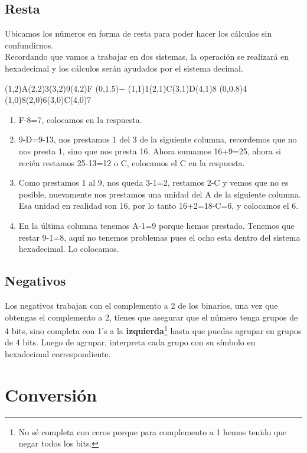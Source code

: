 \documentclass[
	12pt, %
	fleqn, %
	a4paper, %
	oneside, %
]{LegrandOrangeBook}
\begin{document}
\subsection{Resta}
\begin{example}
Ubicamos los números en forma de resta para poder hacer los cálculos sin confundirnos.\\Recordando que vamos a trabajar en dos sistemas, la operación se realizará en hexadecimal y los cálculos serán ayudados por el sistema decimal.
\begin{center}
\par\vspace{2\oplineheight}
\oplput(1,2){A}\oplput(2,2){3}\oplput(3,2){9}\oplput(4,2){F}
\oplput(0,1.5){$-$}
\oplput(1,1){1}\oplput(2,1){C}\oplput(3,1){D}\oplput(4,1){8}
\ophline(0,0.8){4}
\oplput(1,0){8}\oplput(2,0){6}\oplput(3,0){C}\oplput(4,0){7}
\end{center}
\begin{enumerate}
\item F-8=7, colocamos en la respuesta.
\item 9-D=9-13, nos prestamos 1 del 3 de la siguiente columna, recordemos que no nos presta 1, sino que nos presta 16. Ahora sumamos 16+9=25, ahora si recién restamos 25-13=12 o C, colocamos el C en la respuesta.
\item Como prestamos 1 al 9, nos queda 3-1=2, restamos 2-C y vemos que no es posible, nuevamente nos prestamos una unidad del A de la siguiente columna. Esa unidad en realidad son 16, por lo tanto 16+2=18-C=6, y colocamos el 6.
\item En la última columna tenemos A-1=9 porque hemos prestado. Tenemos que restar 9-1=8, aquí no tenemos problemas pues el ocho esta dentro del sistema hexadecimal. Lo colocamos.
\end{enumerate}
\end{example}
\subsection{Negativos}
Los negativos trabajan con el complemento a 2 de los binarios, una vez que obtengas el complemento a 2, tienes que asegurar que el número tenga grupos de 4 bits, sino completa con 1's a la \textbf{izquierda}\footnote{No sé completa con ceros porque para complemento a 1 hemos tenido que negar todos los bits.} hasta que puedas agrupar en grupos de 4 bits. Luego de agrupar, interpreta cada grupo con su símbolo en hexadecimal correspondiente.
\section{Conversión}
\end{document}
